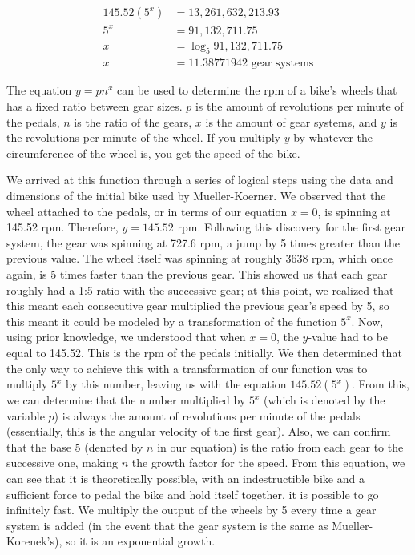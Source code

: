 \begin{align*}
    145.52(5^{x}) &= 13,261,632,213.93 \\
    5^{x} &= 91,132,711.75  \\
    x &= \log_5 91,132,711.75  \\
    x &= 11.38771942 \text{ gear systems}
\end{align*}

The equation $y=pn^{x}$ can be used to determine the rpm of a bike’s wheels that has a fixed ratio between gear sizes. $p$ is the amount of revolutions per minute of the pedals, $n$ is the ratio of the gears, $x$ is the amount of gear systems, and $y$ is the revolutions per minute of
the wheel. If you multiply $y$ by whatever the circumference of the wheel is, you get the speed of the bike.  

We arrived at this function through a series of logical steps using the data and  dimensions of the initial bike used by Mueller-Koerner. We observed that the wheel attached to  the pedals, or in terms of our equation $x=0$, is spinning at 145.52 rpm.  Therefore, $y=145.52$ rpm. Following this discovery for the first gear system, the gear was spinning at 727.6 rpm, a jump by 5 times greater than the previous value. The wheel itself was spinning at roughly 3638 rpm, which once again, is 5 times faster than the previous gear. This showed us that each gear roughly had a 1:5 ratio with the successive gear; at this point, we realized that this meant each consecutive gear multiplied the previous gear’s speed by 5, so this meant it could be modeled by a transformation of the function $5^{x}$. Now, using prior knowledge, we understood that when $x=0$, the $y$-value had to be equal to 145.52. This is the rpm of the pedals initially. We then determined that the only way to achieve this with a transformation  of our function was to multiply $5^{x}$ by this number, leaving us with the equation $145.52(5^{x})$. From this, we can determine that the number multiplied by $5^{x}$ (which is denoted by the variable $p$) is always the amount of revolutions per minute of the pedals (essentially, this is the angular velocity  of the first gear). Also, we can confirm that the base 5 (denoted by $n$ in our equation) is the ratio  from each gear to the successive one, making $n$ the growth factor for the speed.  
From this equation, we can see that it is theoretically possible, with an indestructible bike and a sufficient force to pedal the bike and hold itself together, it is possible to go infinitely fast.  We multiply the output of the wheels by 5 every time a gear system is added (in the event that the gear system is the same as Mueller-Korenek’s), so it is an exponential growth. 


